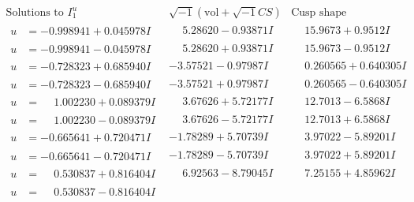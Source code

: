 \documentclass[1p]{elsarticle_modified}
\theoremstyle{definition}
\newcommand{\I}{\sqrt{-1}}
\begin{document}
$$\begin{array}{c|c|c}  
\text{Solutions to }I^u_{1}& \I (\text{vol} + \sqrt{-1}CS) & \text{Cusp shape}\\
 \hline 
\begin{aligned}
u &= -0.998941 + 0.045978 I\end{aligned}
 & \phantom{-}5.28620 - 0.93871 I & \phantom{-}15.9673 + 0.9512 I \\ \hline\begin{aligned}
u &= -0.998941 - 0.045978 I\end{aligned}
 & \phantom{-}5.28620 + 0.93871 I & \phantom{-}15.9673 - 0.9512 I \\ \hline\begin{aligned}
u &= -0.728323 + 0.685940 I\end{aligned}
 & -3.57521 - 0.97987 I & \phantom{-}0.260565 + 0.640305 I \\ \hline\begin{aligned}
u &= -0.728323 - 0.685940 I\end{aligned}
 & -3.57521 + 0.97987 I & \phantom{-}0.260565 - 0.640305 I \\ \hline\begin{aligned}
u &= \phantom{-}1.002230 + 0.089379 I\end{aligned}
 & \phantom{-}3.67626 + 5.72177 I & \phantom{-}12.7013 - 6.5868 I \\ \hline\begin{aligned}
u &= \phantom{-}1.002230 - 0.089379 I\end{aligned}
 & \phantom{-}3.67626 - 5.72177 I & \phantom{-}12.7013 + 6.5868 I \\ \hline\begin{aligned}
u &= -0.665641 + 0.720471 I\end{aligned}
 & -1.78289 + 5.70739 I & \phantom{-}3.97022 - 5.89201 I \\ \hline\begin{aligned}
u &= -0.665641 - 0.720471 I\end{aligned}
 & -1.78289 - 5.70739 I & \phantom{-}3.97022 + 5.89201 I \\ \hline\begin{aligned}
u &= \phantom{-}0.530837 + 0.816404 I\end{aligned}
 & \phantom{-}6.92563 - 8.79045 I & \phantom{-}7.25155 + 4.85962 I \\ \hline\begin{aligned}
u &= \phantom{-}0.530837 - 0.816404 I\end{aligned}

\end{array}$$
\end{document}
